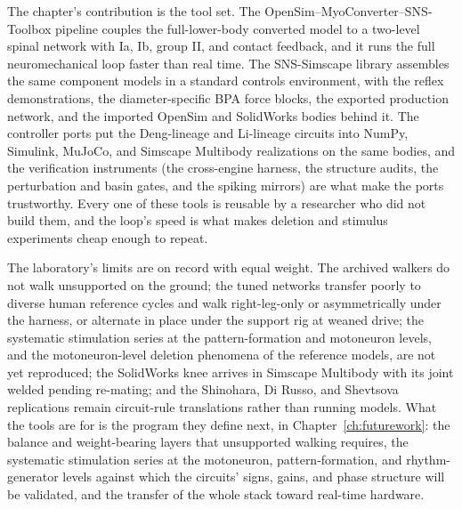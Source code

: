 The chapter's contribution is the tool set. The OpenSim--MyoConverter--SNS-Toolbox pipeline couples the full-lower-body converted model to a two-level spinal network with Ia, Ib, group II, and contact feedback, and it runs the full neuromechanical loop faster than real time. The SNS-Simscape library assembles the same component models in a standard controls environment, with the reflex demonstrations, the diameter-specific BPA force blocks, the exported production network, and the imported OpenSim and SolidWorks bodies behind it. The controller ports put the Deng-lineage and Li-lineage circuits into NumPy, Simulink, MuJoCo, and Simscape Multibody realizations on the same bodies, and the verification instruments (the cross-engine harness, the structure audits, the perturbation and basin gates, and the spiking mirrors) are what make the ports trustworthy. Every one of these tools is reusable by a researcher who did not build them, and the loop's speed is what makes deletion and stimulus experiments cheap enough to repeat.

The laboratory's limits are on record with equal weight. The archived walkers do not walk unsupported on the ground; the tuned networks transfer poorly to diverse human reference cycles and walk right-leg-only or asymmetrically under the harness, or alternate in place under the support rig at weaned drive; the systematic stimulation series at the pattern-formation and motoneuron levels, and the motoneuron-level deletion phenomena of the reference models, are not yet reproduced; the SolidWorks knee arrives in Simscape Multibody with its joint welded pending re-mating; and the Shinohara, Di Russo, and Shevtsova replications remain circuit-rule translations rather than running models. What the tools are for is the program they define next, in Chapter~\ref{ch:futurework}: the balance and weight-bearing layers that unsupported walking requires, the systematic stimulation series at the motoneuron, pattern-formation, and rhythm-generator levels against which the circuits' signs, gains, and phase structure will be validated, and the transfer of the whole stack toward real-time hardware.
